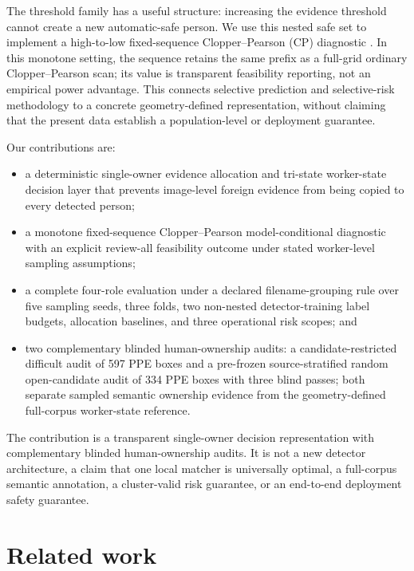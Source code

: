 \documentclass[iicol,pdflatex,sn-mathphys-num]{sn-jnl}
\begin{document}
The threshold family has a useful structure: increasing the evidence threshold cannot create a new automatic-safe person. We use this nested safe set to implement a high-to-low fixed-sequence Clopper--Pearson (CP) diagnostic \cite{clopper1934confidence}. In this monotone setting, the sequence retains the same prefix as a full-grid ordinary Clopper--Pearson scan; its value is transparent feasibility reporting, not an empirical power advantage. This connects selective prediction \cite{geifman2017selective} and selective-risk methodology \cite{angelopoulos2021learntest,angelopoulos2022conformal} to a concrete geometry-defined representation, without claiming that the present data establish a population-level or deployment guarantee.

Our contributions are:

\begin{itemize}
\item a deterministic single-owner evidence allocation and tri-state worker-state decision layer that prevents image-level foreign evidence from being copied to every detected person;
\item a monotone fixed-sequence Clopper--Pearson model-conditional diagnostic with an explicit review-all feasibility outcome under stated worker-level sampling assumptions;
\item a complete four-role evaluation under a declared filename-grouping rule over five sampling seeds, three folds, two non-nested detector-training label budgets, allocation baselines, and three operational risk scopes; and
\item two complementary blinded human-ownership audits: a candidate-restricted difficult audit of 597 PPE boxes and a pre-frozen source-stratified random open-candidate audit of 334 PPE boxes with three blind passes; both separate sampled semantic ownership evidence from the geometry-defined full-corpus worker-state reference.
\end{itemize}

The contribution is a transparent single-owner decision representation with complementary blinded human-ownership audits. It is not a new detector architecture, a claim that one local matcher is universally optimal, a full-corpus semantic annotation, a cluster-valid risk guarantee, or an end-to-end deployment safety guarantee.

\section{Related work}\label{sec:related}
\end{document}
